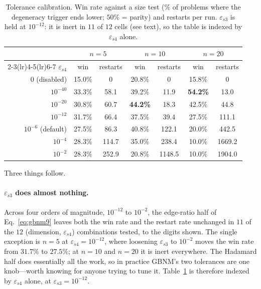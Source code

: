\documentclass[11pt,a4paper]{article}
\begin{document}
\begin{table}[t]
\centering
\caption{Tolerance calibration. Win rate against a size test (\% of problems
where the degeneracy trigger ends lower; $50\%$ = parity) and restarts per run.
$\varepsilon_{s3}$ is held at $10^{-12}$: it is inert in $11$ of $12$ cells (see
text), so the table is indexed by $\varepsilon_{s4}$ alone.}
\label{tab:calibration}
\small
\begin{tabular}{rcc cc cc}
\toprule
& \multicolumn{2}{c}{$n=5$} & \multicolumn{2}{c}{$n=10$} & \multicolumn{2}{c}{$n=20$} \\
\cmidrule(lr){2-3}\cmidrule(lr){4-5}\cmidrule(lr){6-7}
$\varepsilon_{s4}$ & win & restarts & win & restarts & win & restarts \\
\midrule
$0$ (disabled) & 15.0\% & 0 & 20.8\% & 0 & 15.8\% & 0 \\
$10^{-40}$ & 33.3\% & 58.1 & 39.2\% & 11.9 & \textbf{54.2\%} & 13.0 \\
$10^{-20}$ & 30.8\% & 60.7 & \textbf{44.2\%} & 18.3 & 42.5\% & 44.8 \\
$10^{-12}$ & 31.7\% & 66.4 & 37.5\% & 39.4 & 27.5\% & 111.1 \\
$10^{-6}$ (default) & 27.5\% & 86.3 & 40.8\% & 122.1 & 20.0\% & 442.5 \\
$10^{-4}$ & 28.3\% & 114.7 & 35.0\% & 238.4 & 10.0\% & 1669.2 \\
$10^{-2}$ & 28.3\% & 252.9 & 20.8\% & 1148.5 & 10.0\% & 1904.0 \\
\bottomrule
\end{tabular}
\end{table}

Three things follow.

\paragraph{$\varepsilon_{s3}$ does almost nothing.} Across four orders of
magnitude, $10^{-12}$ to $10^{-2}$, the edge-ratio half of Eq.~\eqref{eq:gbnm9}
leaves both the win rate and the restart rate unchanged in $11$ of the $12$
(dimension, $\varepsilon_{s4}$) combinations tested, to the digits shown. The
single exception is $n=5$ at $\varepsilon_{s4}=10^{-12}$, where loosening
$\varepsilon_{s3}$ to $10^{-2}$ moves the win rate from $31.7\%$ to $27.5\%$;
at $n=10$ and $n=20$ it is inert everywhere. The Hadamard half does essentially
all the work, so in practice GBNM's two tolerances are one knob---worth knowing
for anyone trying to tune it. Table~\ref{tab:calibration} is therefore indexed
by $\varepsilon_{s4}$ alone, at $\varepsilon_{s3}=10^{-12}$.
\end{document}
